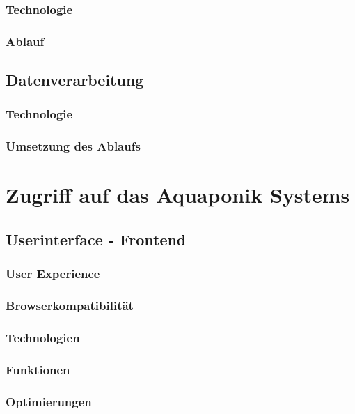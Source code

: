 \documentclass[12pt]{article}
\begin{document}
\subsubsection{Technologie}
%

\subsubsection{Ablauf}
%

\subsection{Datenverarbeitung}
%

\subsubsection{Technologie}
%

\subsubsection{Umsetzung des Ablaufs}
%


\newpage %
\section{Zugriff auf das Aquaponik Systems}
%

\subsection{Userinterface - Frontend}
\subsubsection{User Experience}
\subsubsection{Browserkompatibilität}
\subsubsection{Technologien}
\subsubsection{Funktionen}
\subsubsection{Optimierungen}
\end{document}
